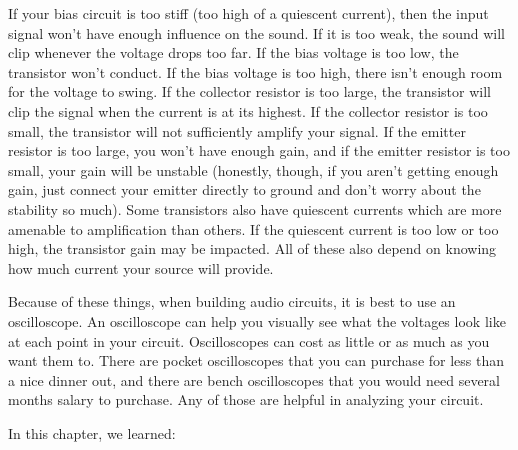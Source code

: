 If your bias circuit is too stiff (too high of a quiescent current), then the input signal won't have enough influence on the sound.  
If it is too weak, the sound will clip whenever the voltage drops too far.
If the bias voltage is too low, the transistor won't conduct.
If the bias voltage is too high, there isn't enough room for the voltage to swing.
If the collector resistor is too large, the transistor will clip the signal when the current is at its highest.
If the collector resistor is too small, the transistor will not sufficiently amplify your signal.
If the emitter resistor is too large, you won't have enough gain, and if the emitter resistor is too small, your gain will be unstable (honestly, though, if you aren't getting enough gain, just connect your emitter directly to ground and don't worry about the stability so much).
Some transistors also have quiescent currents which are more amenable to amplification than others.
If the quiescent current is too low or too high, the transistor gain may be impacted.
All of these also depend on knowing how much current your source will provide.

Because of these things, when building audio circuits, it is best to use an oscilloscope.
An oscilloscope can help you visually see what the voltages look like at each point in your circuit.
Oscilloscopes can cost as little or as much as you want them to.
There are pocket oscilloscopes that you can purchase for less than a nice dinner out, and there are bench oscilloscopes that you would need several months salary to purchase.
Any of those are helpful in analyzing your circuit.

\reviewsection

In this chapter, we learned:

